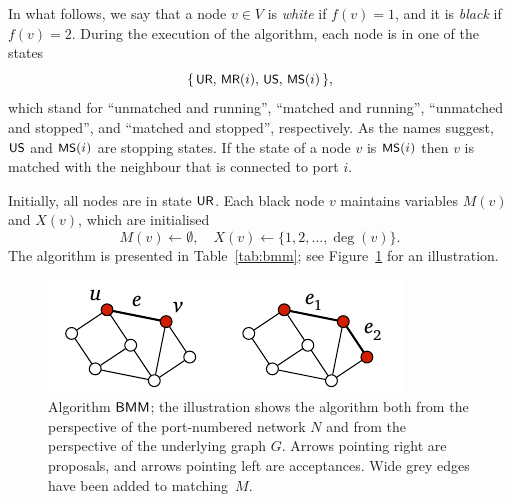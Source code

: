 In what follows, we say that a node $v \in V$ is \emph{white} if $f(v) = 1$, and it is \emph{black} if $f(v) = 2$. During the execution of the algorithm, each node is in one of the states
\[
    \{\, 
        \textsf{\small UR},\,
        \textsf{\small MR}(i),\,
        \textsf{\small US},\,
        \textsf{\small MS}(i)
     \,\},
\]
which stand for ``unmatched and running'', ``matched and running'', ``unmatched and stopped'', and ``matched and stopped'', respectively. As the names suggest, $\textsf{\small US}$ and $\textsf{\small MS}(i)$ are stopping states. If the state of a node $v$ is $\textsf{\small MS}(i)$ then $v$ is matched with the neighbour that is connected to port $i$.

Initially, all nodes are in state $\textsf{\small UR}$. Each black node $v$ maintains variables $M(v)$ and $X(v)$, which are initialised
\[
    M(v) \gets \emptyset, \quad X(v) \gets \{ 1,2, \dotsc, \deg(v) \}.
\]
The algorithm is presented in Table~\ref{tab:bmm}; see Figure~\ref{fig:bmm} for an illustration.

\begin{figure}
    \centering
    \includegraphics[page=\PMaximalMatching]{figs.pdf}
    \caption{Algorithm $\textsf{BMM}$; the illustration shows the algorithm both from the perspective of the port-numbered network $N$ and from the perspective of the underlying graph $G$. Arrows pointing right are proposals, and arrows pointing left are acceptances. Wide grey edges have been added to matching~$M$.}\label{fig:bmm}
\end{figure}

